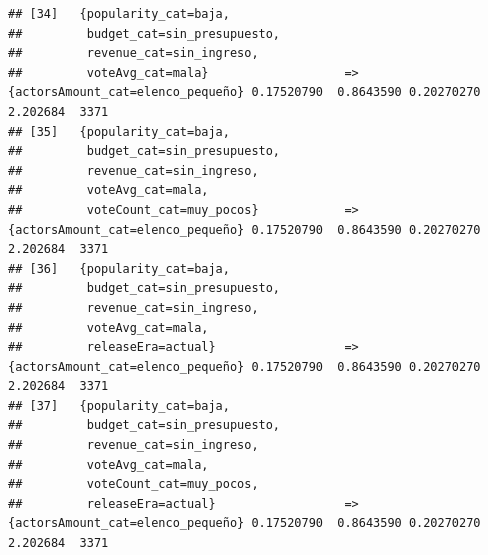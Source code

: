 \documentclass[
]{article}
\begin{document}
\begin{verbatim}
## [34]   {popularity_cat=baja,                                                                                                    
##         budget_cat=sin_presupuesto,                                                                                             
##         revenue_cat=sin_ingreso,                                                                                                
##         voteAvg_cat=mala}                   => {actorsAmount_cat=elenco_pequeño} 0.17520790  0.8643590 0.20270270 2.202684  3371
## [35]   {popularity_cat=baja,                                                                                                    
##         budget_cat=sin_presupuesto,                                                                                             
##         revenue_cat=sin_ingreso,                                                                                                
##         voteAvg_cat=mala,                                                                                                       
##         voteCount_cat=muy_pocos}            => {actorsAmount_cat=elenco_pequeño} 0.17520790  0.8643590 0.20270270 2.202684  3371
## [36]   {popularity_cat=baja,                                                                                                    
##         budget_cat=sin_presupuesto,                                                                                             
##         revenue_cat=sin_ingreso,                                                                                                
##         voteAvg_cat=mala,                                                                                                       
##         releaseEra=actual}                  => {actorsAmount_cat=elenco_pequeño} 0.17520790  0.8643590 0.20270270 2.202684  3371
## [37]   {popularity_cat=baja,                                                                                                    
##         budget_cat=sin_presupuesto,                                                                                             
##         revenue_cat=sin_ingreso,                                                                                                
##         voteAvg_cat=mala,                                                                                                       
##         voteCount_cat=muy_pocos,                                                                                                
##         releaseEra=actual}                  => {actorsAmount_cat=elenco_pequeño} 0.17520790  0.8643590 0.20270270 2.202684  3371

\end{verbatim}
\end{document}
